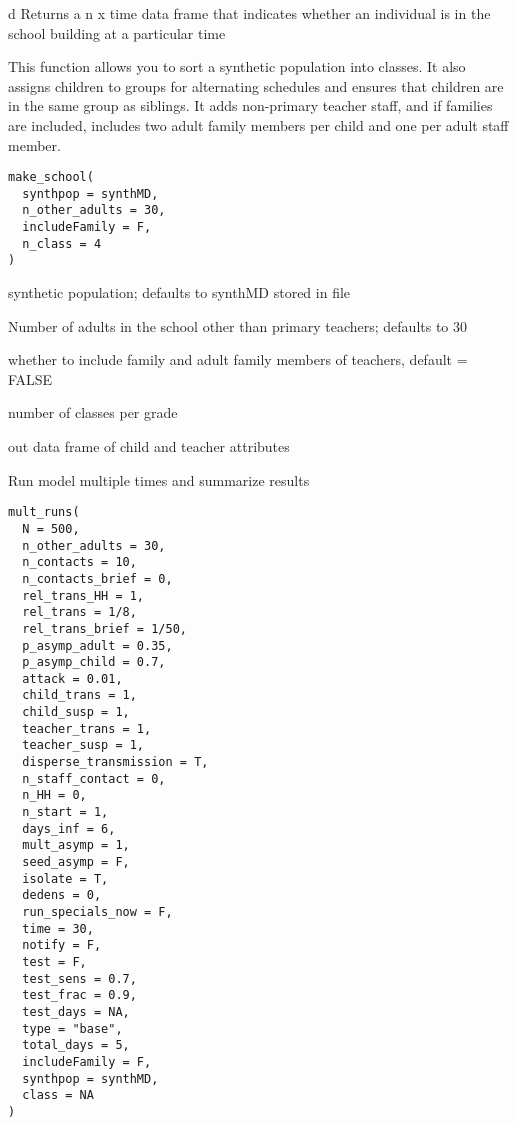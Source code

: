 \documentclass[a4paper]{book}
\begin{document}
%
\begin{Value}
d Returns a n x time data frame that indicates whether an individual is
in the school building at a particular time
\end{Value}
%
\begin{Description}\relax
This function allows you to sort a synthetic population into classes.
It also assigns children to groups for alternating schedules and
ensures that children are in the same group as siblings.
It adds non-primary teacher staff, and if families are included, includes
two adult family members per child and one per adult staff member.
\end{Description}
%
\begin{Usage}
\begin{verbatim}
make_school(
  synthpop = synthMD,
  n_other_adults = 30,
  includeFamily = F,
  n_class = 4
)
\end{verbatim}
\end{Usage}
%
\begin{Arguments}
\begin{ldescription}
\item[\code{synthpop}] synthetic population; defaults to synthMD stored in file

\item[\code{n\_other\_adults}] Number of adults in the school other than primary teachers; defaults to 30

\item[\code{includeFamily}] whether to include family and adult family members of teachers, default = FALSE

\item[\code{n\_class}] number of classes per grade
\end{ldescription}
\end{Arguments}
%
\begin{Value}
out data frame of child and teacher attributes
\end{Value}
%
\begin{Description}\relax
Run model multiple times and summarize results
\end{Description}
%
\begin{Usage}
\begin{verbatim}
mult_runs(
  N = 500,
  n_other_adults = 30,
  n_contacts = 10,
  n_contacts_brief = 0,
  rel_trans_HH = 1,
  rel_trans = 1/8,
  rel_trans_brief = 1/50,
  p_asymp_adult = 0.35,
  p_asymp_child = 0.7,
  attack = 0.01,
  child_trans = 1,
  child_susp = 1,
  teacher_trans = 1,
  teacher_susp = 1,
  disperse_transmission = T,
  n_staff_contact = 0,
  n_HH = 0,
  n_start = 1,
  days_inf = 6,
  mult_asymp = 1,
  seed_asymp = F,
  isolate = T,
  dedens = 0,
  run_specials_now = F,
  time = 30,
  notify = F,
  test = F,
  test_sens = 0.7,
  test_frac = 0.9,
  test_days = NA,
  type = "base",
  total_days = 5,
  includeFamily = F,
  synthpop = synthMD,
  class = NA
)
\end{verbatim}
\end{Usage}
\end{document}

